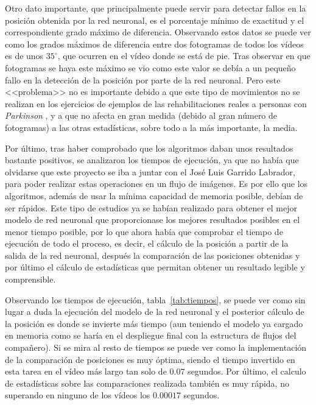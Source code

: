 {Otro dato importante, que principalmente puede servir para detectar fallos en la posición obtenida por la red neuronal, es el porcentaje mínimo de exactitud y el correspondiente grado máximo de diferencia. Observando estos datos se puede ver como los grados máximos de diferencia entre dos fotogramas de todos los vídeos es de unos $35^{\circ}$, que ocurren en el vídeo donde se está de pie. Tras observar en que fotogramas se haya este máximo se vio como este valor se debía a un pequeño fallo en la detección de la posición por parte de la red neuronal. Pero este <<problema>> no es importante debido a que este tipo de movimientos no se realizan en los ejercicios de ejemplos de las rehabilitaciones reales a personas con \textit{Parkinson} , y a que no afecta en gran medida (debido al gran número de fotogramas) a las otras estadísticas, sobre todo a la más importante, la media.

Por último, tras haber comprobado que los algoritmos daban unos resultados bastante positivos, se analizaron los tiempos de ejecución, ya que no había que olvidarse que este proyecto se iba a juntar con el José Luis Garrido Labrador, para poder realizar estas operaciones en un flujo de imágenes. Es por ello que los algoritmos, además de usar la mínima capacidad de memoria posible, debían de ser rápidos. Este tipo de estudios ya se habían realizado para obtener el mejor modelo de red neuronal que proporcionase los mejores resultados posibles en el menor tiempo posible, por lo que ahora había que comprobar el tiempo de ejecución de todo el proceso, es decir,  el cálculo de la posición a partir de la salida de la red neuronal, después la comparación de las posiciones obtenidas y por último el cálculo de estadísticas que permitan obtener un resultado legible y comprensible.

Observando los tiempos de ejecución, tabla~\ref{tab:tiempos}, se puede ver como sin lugar a duda la ejecución del modelo de la red neuronal y el posterior cálculo de la posición es donde se invierte más tiempo (aun teniendo el modelo ya cargado en memoria como se haría en el despliegue final con la estructura de flujos del compañero). Si se mira al resto de tiempos se puede ver como la implementación de la comparación de posiciones es muy óptima, siendo el tiempo invertido en esta tarea en el vídeo más largo tan solo de $0.07$ segundos. Por último, el calculo de estadísticas sobre las comparaciones realizada también es muy rápida, no superando en ninguno de los vídeos los $0.00017$ segundos.

}
